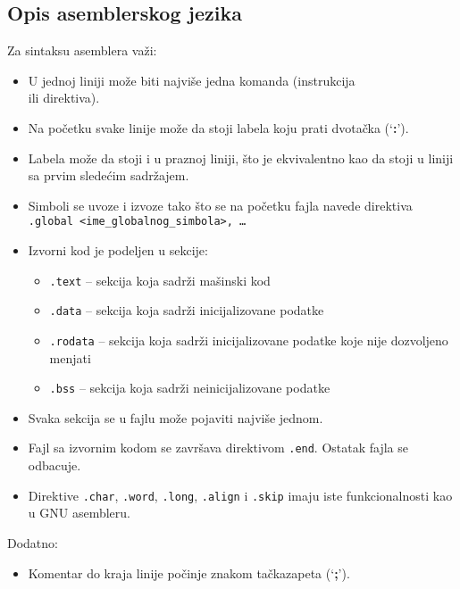 \subsection{Opis asemblerskog jezika}
Za sintaksu asemblera važi:
\begin{itemize}
    \item U jednoj liniji može biti najviše jedna komanda
          (instrukcija\\
          ili direktiva).
    \item Na početku svake linije može da stoji labela koju prati dvotačka
          (`\textbf{:}').
    \item Labela može da stoji i u praznoj liniji, što je ekvivalentno
          kao da stoji u liniji sa prvim sledećim sadržajem.
    \item Simboli se uvoze i izvoze tako što se na početku fajla navede
          direktiva \texttt{.global <ime\_globalnog\_simbola>, \ldots}
    \item Izvorni kod je podeljen u sekcije:
          \begin{itemize}
              \item \texttt{.text} -- sekcija koja sadrži mašinski kod
              \item \texttt{.data} -- sekcija koja sadrži inicijalizovane
                    podatke
              \item \texttt{.rodata} -- sekcija koja sadrži inicijalizovane
                    podatke koje nije dozvoljeno menjati
              \item \texttt{.bss} -- sekcija koja sadrži neinicijalizovane
                    podatke
          \end{itemize}
    \item Svaka sekcija se u fajlu može pojaviti najviše jednom.
    \item Fajl sa izvornim kodom se završava direktivom \texttt{.end}.
          Ostatak fajla se odbacuje.
      \item Direktive \texttt{.char}, \texttt{.word},
            \texttt{.long}, \texttt{.align} i \texttt{.skip} imaju iste
            funkcionalno\-sti kao u GNU asembleru.
\end{itemize}

\noindent Dodatno:
\begin{itemize}
    \item Komentar do kraja linije počinje znakom
          tačkazapeta (`\textbf{;}').
\end{itemize}

